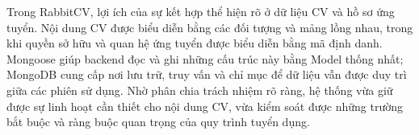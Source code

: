 Trong RabbitCV, lợi ích của sự kết hợp thể hiện rõ ở dữ liệu CV và hồ sơ ứng tuyển. Nội dung CV được biểu diễn bằng các đối tượng và mảng lồng nhau, trong khi quyền sở hữu và quan hệ ứng tuyển được biểu diễn bằng mã định danh. Mongoose giúp backend đọc và ghi những cấu trúc này bằng Model thống nhất; MongoDB cung cấp nơi lưu trữ, truy vấn và chỉ mục để dữ liệu vẫn được duy trì giữa các phiên sử dụng. Nhờ phân chia trách nhiệm rõ ràng, hệ thống vừa giữ được sự linh hoạt cần thiết cho nội dung CV, vừa kiểm soát được những trường bắt buộc và ràng buộc quan trọng của quy trình tuyển dụng.







